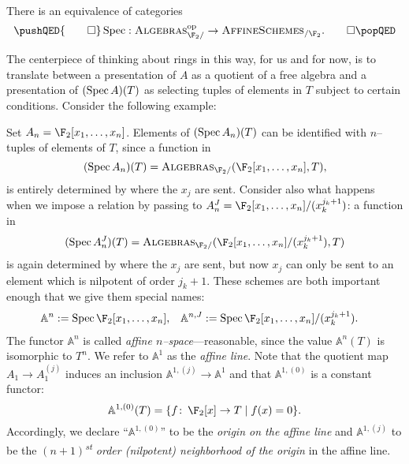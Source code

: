 \begin{lemma}
There is an equivalence of categories
\[
\pushQED{\qed}
\Spec: \CatOf{Algebras}_{\F_2/}^{\mathrm{op}} \to \CatOf{AffineSchemes}_{/\F_2}.\qedhere
\popQED
\]
\end{lemma}

The centerpiece of thinking about rings in this way, for us and for now, is to translate between a presentation of \(A\) as a quotient of a free algebra and a presentation of \((\operatorname{Spec} A)(T)\) as selecting tuples of elements in \(T\) subject to certain conditions.  Consider the following example:
\begin{example}\label{FiniteOrderAffineSpaceDefn}
Set \(A_n = \F_2[x_1, \ldots, x_n]\).  Elements of \((\operatorname{Spec} A_n)(T)\) can be identified with \(n\)--tuples of elements of \(T\), since a function in \[(\Spec A_n)(T) = \CatOf{Algebras}_{\F_2/}(\F_2[x_1, \ldots, x_n], T),\] is entirely determined by where the \(x_j\) are sent.  Consider also what happens when we impose a relation by passing to \(A_n^J = \F_2[x_1, \ldots, x_n] / (x_k^{j_k+1})\): a function in \[(\Spec A_n^J)(T) = \CatOf{Algebras}_{\F_2/}(\F_2[x_1, \ldots, x_n] / (x_k^{j_k+1}), T)\] is again determined by where the \(x_j\) are sent, but now \(x_j\) can only be sent to an element which is nilpotent of order \(j_k+1\).  These schemes are both important enough that we give them special names:
\begin{align*}
\mathbb A^n & := \Spec \F_2[x_1, \ldots, x_n], & \mathbb A^{n, J} & := \Spec \F_2[x_1, \ldots, x_n] / (x_k^{j_k+1}).
\end{align*}
The functor \(\mathbb A^n\) is called \textit{affine \(n\)--space}---reasonable, since the value \(\mathbb A^n(T)\) is isomorphic to \(T^n\).  We refer to \(\mathbb A^1\) as the \textit{affine line}.  Note that the quotient map \(A_1 \to A_1^{(j)}\) induces an inclusion \(\mathbb A^{1, (j)} \to \mathbb A^1\) and that \(\mathbb A^{1, (0)}\) is a constant functor: \[\mathbb A^{1, (0)}(T) = \{f\co \F_2[x] \to T \mid f(x) = 0\}.\]  Accordingly, we declare ``\(\mathbb A^{1, (0)}\)'' to be the \textit{origin on the affine line} and \(\mathbb A^{1, (j)}\) to be the \textit{\((n+1)\)\textsuperscript{st} order (nilpotent) neighborhood of the origin} in the affine line.
\end{example}

